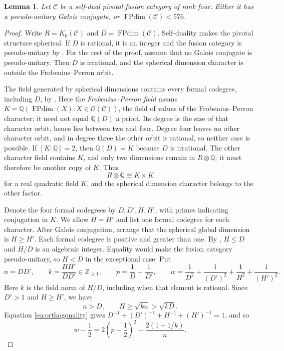 \documentclass[11pt]{amsart}
\newtheorem{lemma}[theorem]{Lemma}
\theoremstyle{definition}
\DeclareMathOperator{\FPdim}{FPdim}
\newcommand{\Q}{\mathbb Q}
\newcommand{\Z}{\mathbb Z}
\numberwithin{equation}{section}
\begin{document}
\begin{lemma}\label{lem:exceptional}
Let $\mathcal C$ be a self-dual pivotal fusion category of rank four. Either it has a pseudo-unitary Galois conjugate, or $\FPdim(\mathcal C)<576$.
\end{lemma}
\begin{proof}
Write $R=K_0(\mathcal C)$ and $D=\FPdim(\mathcal C)$.
Self-duality makes the pivotal structure spherical. If $D$ is rational,
it is an integer and the fusion category is pseudo-unitary by \cite[Proposition~8.24]{ENO}. For the rest of the proof, assume that no Galois conjugate is pseudo-unitary. Then $D$ is irrational, and the spherical dimension character is outside the Frobenius--Perron orbit.

The field generated by spherical dimensions contains every formal codegree, including $D$, by \cite[Corollary~2.15]{OstrikRank3}. Here the \emph{Frobenius--Perron field} means
$K=\Q(\FPdim(X):X\in\mathcal O(\mathcal C))$, the field of
values of the Frobenius--Perron character; it need not equal $\Q(D)$
a priori. Its degree is the size of that character orbit, hence lies
between two and four. Degree four leaves no other character orbit, and in degree three the other orbit is rational, so neither case is possible. If $[K:\Q]=2$, then $\Q(D)=K$ because $D$ is irrational.
The other character field contains $K$, and only two dimensions remain
in $R\otimes\Q$; it must therefore be another copy of $K$. Thus
\begin{equation}\label{eq:repeated-quadratic}
 R\otimes\Q\cong K\times K
\end{equation}
for a real quadratic field $K$, and the spherical dimension character belongs to the other factor.

Denote the four formal codegrees by $D,D',H,H'$, with primes indicating conjugation in $K$. We allow $H=H'$ and list one formal codegree for each character. After Galois conjugation, arrange that the spherical global dimension is $H\geq H'$. Each formal codegree is positive and greater than one.
By \cite[Propositions~8.21 and~8.22]{ENO}, $H\leq D$ and
$H/D$ is an algebraic integer. Equality would make the fusion
category pseudo-unitary, so $H<D$ in the exceptional case. Put
\[
 n=DD',\qquad k=\frac{HH'}{DD'}\in\Z_{\geq1},\qquad
 p=\frac1D+\frac1{D'},\qquad
 w=\frac1{D^2}+\frac1{(D')^2}+\frac1{H^2}+\frac1{(H')^2}.
\]
Here $k$ is the field norm of $H/D$, including when that element is rational. Since $D'>1$ and $H\geq H'$, we have
\begin{equation}\label{eq:exceptional-size}
 n>D,\qquad H\geq\sqrt{kn}>\sqrt{kD}.
\end{equation}
Equation \eqref{eq:orthogonality} gives $D^{-1}+(D')^{-1}+H^{-1}+(H')^{-1}=1$, and so
\begin{equation}\label{eq:exceptional-w}
 w-\frac12=2\left(p-\frac12\right)^2-\frac{2(1+1/k)}n.
\end{equation}


\end{proof}
\end{document}
